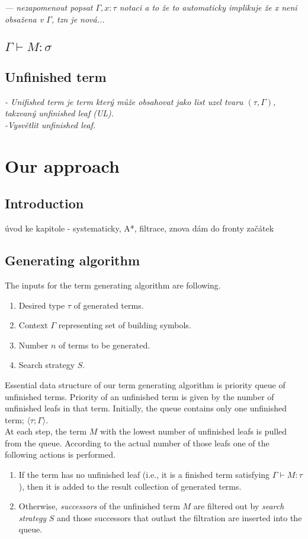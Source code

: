 \documentclass{llncs}
\newcommand{\tur}[3]{#1\vdash{}#2 \colon #3}
\newcommand{\turst}[3]{$#1\vdash{}#2:#3$\xspace}
\newcommand{\GMS}{\turst{\Gamma}{M}{\sigma}}
\newcommand{\ul}[2]{\langle #1 ; #2 \rangle}
\begin{document}
\textit{--- nezapomenout popsat $\Gamma,x:\tau$ notaci
 a to že to automaticky implikuje že x neni obsažena v $\Gamma$,
 tzn je nová...}

\subsection{\GMS}

\subsection{Unfinished term}

\textit{- Unifished term je term který může obsahovat jako list uzel tvaru 
$(\tau,\Gamma)$, takzvaný unfinished leaf (UL).\\
-Vysvětlit unfinished leaf.\\}

\section{Our approach}
\subsection{Introduction}
úvod ke kapitole - systematicky, A*, filtrace, znova dám do fronty začátek

\subsection{Generating algorithm}

The inputs for the term generating algorithm are following.
\begin{enumerate}
 \item Desired type $\tau$ of generated terms.
 \item Context $\Gamma$ representing set of building symbols.
 \item Number $n$ of terms to be generated.
 \item Search strategy $S$. 
\end{enumerate}

Essential data structure of our term generating algorithm 
is priority queue of unfinished terms. 
Priority of an unfinished term is given by 
the number of unfinished leafs in that term.
Initially, the queue contains only one unfinished term; 
$\ul{\tau}{\Gamma}$.\\

At each step, the term $M$ with the lowest number of 
unfinished leafs is pulled from the queue.
According to the actual number of those leafs one of
the following actions is performed.
\begin{enumerate}
 \item If the term has no unfinished leaf (i.e., it is a finished
 term satisfying \mbox{$\tur{\Gamma}{M}{\tau}$}), then it is added to the
 result collection of generated terms.   
 \item Otherwise, \textit{successors} of the unfinished term $M$ are
       filtered out by \textit{search strategy} $S$ and
       those successors that outlast the filtration 
       are inserted into the queue.
\end{enumerate}
\end{document}
